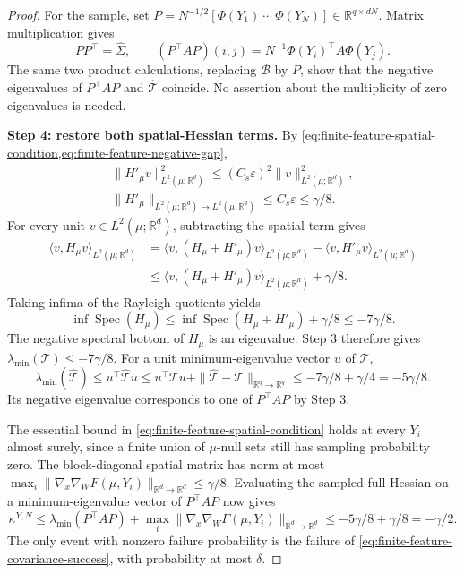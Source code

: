 \begin{proof}
For the sample, set
$P=N^{-1/2}[\Phi(Y_1)\ \cdots\ \Phi(Y_N)]\in\mathbb R^{q\times dN}$.
Matrix multiplication gives
\[
 PP^\top=\widehat\Sigma,\qquad
 (P^\top AP)(i,j)=N^{-1}\Phi(Y_i)^\top A\Phi(Y_j).
\]
The same two product calculations, replacing $\mathcal B$ by $P$, show
that the negative eigenvalues of $P^\top AP$ and
$\widehat{\mathcal T}$ coincide. No assertion about the multiplicity
of zero eigenvalues is needed.

\par\noindent\textbf{Step 4: restore both spatial-Hessian terms.}
By \cref{eq:finite-feature-spatial-condition,eq:finite-feature-negative-gap},
\begin{gather*}
 \|H'_\mu v\|_{L^2(\mu;\mathbb R^d)}^2
 \le(C_s\varepsilon)^2\|v\|_{L^2(\mu;\mathbb R^d)}^2,\\
 \|H'_\mu\|_{L^2(\mu;\mathbb R^d)\to L^2(\mu;\mathbb R^d)}\le C_s\varepsilon\le\gamma/8.
\end{gather*}
For every unit $v\in L^2(\mu;\mathbb R^d)$, subtracting the spatial term gives
\begin{align*}
 \langle v,H_\mu v\rangle_{L^2(\mu;\mathbb R^d)}
 &=\langle v,(H_\mu+H'_\mu)v\rangle_{L^2(\mu;\mathbb R^d)}
      -\langle v,H'_\mu v\rangle_{L^2(\mu;\mathbb R^d)}\\
 &\le\langle v,(H_\mu+H'_\mu)v\rangle_{L^2(\mu;\mathbb R^d)}+\gamma/8.
\end{align*}
Taking infima of the Rayleigh quotients yields
\[
 \inf\operatorname{Spec}(H_\mu)
 \le\inf\operatorname{Spec}(H_\mu+H'_\mu)+\gamma/8
 \le-7\gamma/8.
\]
The negative spectral bottom of $H_\mu$ is an eigenvalue.
Step 3 therefore gives $\lambda_{\min}(\mathcal T)\le-7\gamma/8$.
For a unit minimum-eigenvalue vector $u$ of $\mathcal T$,
\[
 \lambda_{\min}(\widehat{\mathcal T})
 \le u^\top\widehat{\mathcal T}u
 \le u^\top\mathcal Tu+\|\widehat{\mathcal T}-\mathcal T\|_{\mathbb R^q\to\mathbb R^q}
 \le-7\gamma/8+\gamma/4=-5\gamma/8.
\]
Its negative eigenvalue corresponds to one of $P^\top AP$ by Step 3.

The essential bound in \eqref{eq:finite-feature-spatial-condition}
holds at every $Y_i$ almost surely, since a finite union of $\mu$-null
sets still has sampling probability zero. The block-diagonal spatial
matrix has norm at most
$\max_i\|\nabla_x\nabla_WF(\mu,Y_i)\|_{\mathbb R^d\to\mathbb R^d}\le\gamma/8$.
Evaluating the sampled full Hessian on a minimum-eigenvalue vector of
$P^\top AP$ now gives
\[
 \kappa^{Y,N}
 \le\lambda_{\min}(P^\top AP)
       +\max_i\|\nabla_x\nabla_WF(\mu,Y_i)\|_{\mathbb R^d\to\mathbb R^d}
 \le-5\gamma/8+\gamma/8=-\gamma/2.
\]
The only event with nonzero failure probability is the failure of
\eqref{eq:finite-feature-covariance-success}, with probability at most $\delta$.
\end{proof}

